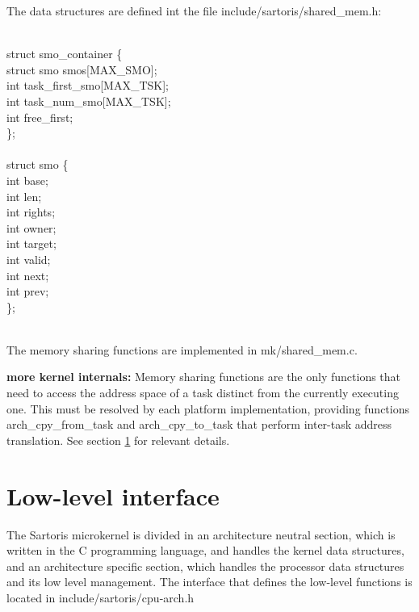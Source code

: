 \documentclass[11pt, letterpaper, twoside, english]{book}
\begin{document}
The data structures are defined int the file \textsf{include/sartoris/shared\_mem.h}: \\
\\
\begin{sf} \noindent struct smo\_container \{ \\
\indent  struct smo smos[MAX\_SMO]; \\ 
\indent  int task\_first\_smo[MAX\_TSK]; \\ 
\indent  int task\_num\_smo[MAX\_TSK]; \\
\indent  int free\_first; \\
\}; \\
\\
struct smo \{ \\
\indent  int base; \\
\indent   int len; \\
\indent   int rights; \\
\indent   int owner; \\
\indent   int target; \\
\indent   int valid; \\
\indent   int next; \\
\indent   int prev; \\
\}; \\
\end{sf}
\\
The memory sharing functions are implemented in \textsf{mk/shared\_mem.c}.

\textbf{more kernel internals:} Memory sharing functions are the only functions that need to access the address space of a task distinct from the currently executing one. This must be resolved by each platform implementation, providing functions \textsf{arch\_cpy\_from\_task} and \textsf{arch\_cpy\_to\_task} that perform inter-task address translation. See section \ref{sec:lowlevelinterface} for relevant details.

\section{Low-level interface} \label{sec:lowlevelinterface}
The Sartoris microkernel is divided in an architecture neutral section, which is written in the C programming language, and handles the kernel data structures, and an architecture specific section, which handles the processor data structures and its low level management. The interface that defines the low-level functions is located in \textsf{include/sartoris/cpu-arch.h}
\end{document}
